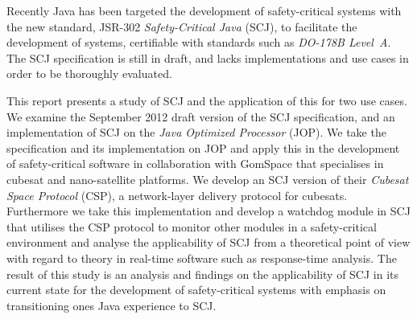 Recently Java has been targeted the development of safety-critical systems with the new standard, JSR-302 \textit{Safety-Critical Java} (SCJ), to facilitate the development of systems, certifiable with standards such as \textit{DO-178B Level~A}. The SCJ specification is still in draft, and lacks implementations and use cases in order to be thoroughly evaluated. 

This report presents a study of SCJ and the application of this for two use cases.
We examine the September 2012 draft version of the SCJ specification, and an implementation of SCJ on the \textit{Java Optimized Processor} (JOP). We take the specification and its implementation on JOP and apply this in the development of safety-critical software in collaboration with GomSpace that specialises in cubesat and nano-satellite platforms. We develop an SCJ version of their \textit{Cubesat Space Protocol} (CSP), a network-layer delivery protocol for cubesats. Furthermore we take this implementation and develop a watchdog module in SCJ that utilises the CSP protocol to monitor other modules in a safety-critical environment and analyse the applicability of SCJ from a theoretical point of view with regard to theory in real-time software such as response-time analysis. The result of this study is an analysis and findings on the applicability of SCJ in its current state for the development of safety-critical systems with emphasis on transitioning ones Java experience to SCJ.
